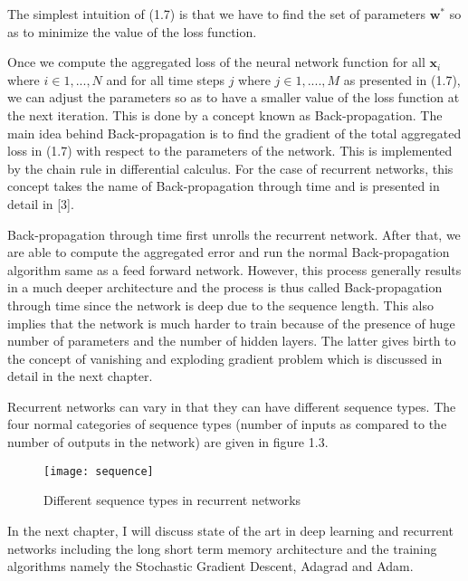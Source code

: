 The simplest intuition of (1.7) is that we have to find the set of parameters $\textbf{w}^*$ so as to minimize the value of the loss function. 

Once we compute the aggregated loss of the neural network function for all $\textbf{x}_i$ where $i\in 1,...,N$ and for all time steps $j$ where $j\in 1,....,M$ as presented in (1.7), we can adjust the parameters so as to have a smaller value of the loss function at the next iteration. This is done by a concept known as Back-propagation. The main idea behind Back-propagation is to find the gradient of the total aggregated loss in (1.7) with respect to the parameters of the network. This is implemented by the chain rule in differential calculus. For the case of recurrent networks, this concept takes the name of Back-propagation through time and is presented in detail in [3]. 

Back-propagation through time first unrolls the recurrent network. After that, we are able to compute the aggregated error and run the normal Back-propagation algorithm same as a feed forward network. However, this process generally results in a much deeper architecture and the process is thus called Back-propagation through time since the network is deep due to the sequence length. This also implies that the network is much harder to train because of the presence of huge number of parameters and the number of hidden layers. The latter gives birth to the concept of vanishing and exploding gradient problem which is discussed in detail in the next chapter.     
  

Recurrent networks can vary in that they can have different sequence types. The four normal categories of sequence types (number of inputs as compared to the number of outputs in the network) are given in figure 1.3. 
\begin{figure}
\centering
\texttt{[image: sequence]}
\caption{Different sequence types in recurrent networks}
\end{figure}

In the next chapter, I will discuss state of the art in deep learning and recurrent networks including the long short term memory architecture and the training algorithms namely the Stochastic Gradient Descent, Adagrad and Adam. 
















